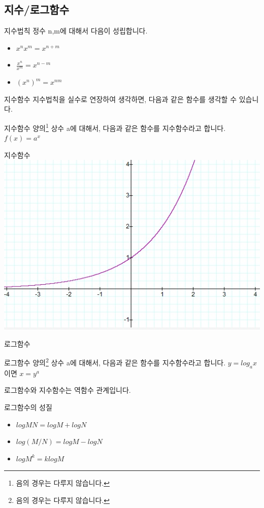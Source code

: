\documentclass{beamer}
\begin{document}
\subsection{지수/로그함수} 

\begin{frame}{지수법칙}
정수 n,m에 대해서 다음이 성립합니다. 

\begin{itemize}
\item $x^n x^m = x^{n+m}$
\item $\frac{x^n}{x^m} = x^{n-m}$
\item $(x^n)^m = x^{nm}$
\end{itemize}
\end{frame}


\begin{frame}{지수함수}
지수법칙을 실수로 연장하여 생각하면, 다음과 같은 함수를 생각할 수 있습니다. 
\begin{block}{지수함수}
양의\footnote{음의 경우는 다루지 않습니다.} 상수 a에 대해서, 다음과 같은 함수를 지수함수라고 합니다. $f(x) = a^x$
\end{block}
\end{frame}

\begin{frame}{지수함수}
\includegraphics[width=\textwidth]{exp}
\end{frame}

\begin{frame}{로그함수} 
\begin{block}{로그함수}
양의\footnote{음의 경우는 다루지 않습니다.} 상수 a에 대해서, 다음과 같은 함수를 지수함수라고 합니다. $y = log_{a} x$ 이면 $ x = y^a$
\end{block}
로그함수와 지수함수는 역함수 관계입니다. 

\end{frame}

\begin{frame}{로그함수의 성질} 
\begin{itemize} 
\item $log MN = log M + log N$
\item $log (M/N) = log M - log N$
\item $log M^k = k log M $
\end{itemize}
\end{frame}
\end{document}
